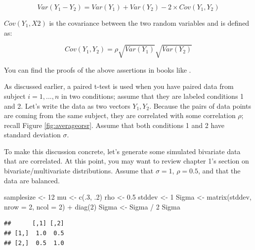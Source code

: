 \documentclass[
  12pt,
]{krantz}
\newenvironment{Shaded}{\begin{snugshade}}{\end{snugshade}}
\newcommand{\AttributeTok}[1]{\textcolor[rgb]{0.77,0.63,0.00}{#1}}
\newcommand{\DecValTok}[1]{\textcolor[rgb]{0.00,0.00,0.81}{#1}}
\newcommand{\FloatTok}[1]{\textcolor[rgb]{0.00,0.00,0.81}{#1}}
\newcommand{\FunctionTok}[1]{\textcolor[rgb]{0.00,0.00,0.00}{#1}}
\newcommand{\NormalTok}[1]{#1}
\newcommand{\OtherTok}[1]{\textcolor[rgb]{0.56,0.35,0.01}{#1}}
\newcommand{\SpecialCharTok}[1]{\textcolor[rgb]{0.00,0.00,0.00}{#1}}
\theoremstyle{definition}
\theoremstyle{definition}
\theoremstyle{definition}
\theoremstyle{definition}
\theoremstyle{remark}
\begin{document}
\begin{equation}
Var(Y_1-Y_2)=Var(Y_1) + Var(Y_2) - 2\times Cov(Y_1, Y_2)
\end{equation}

\(Cov(Y_1, X2)\) is the covariance between the two random variables and is defined as:

\begin{equation}
Cov(Y_1, Y_2) = \rho \sqrt{Var(Y_1)}\sqrt{Var(Y_2)}
\end{equation}

You can find the proofs of the above assertions in books like \citet{rice1995mathematical}.

As discussed earlier, a paired t-test is used when you have paired data from subject \(i=1,...,n\) in two conditions; assume that they are labeled conditions 1 and 2. Let's write the data as two vectors \(Y_{1}, Y_{2}\). Because the pairs of data points are coming from the same subject, they are correlated with some correlation \(\rho\); recall Figure \ref{fig:averageorsr}. Assume that both conditions 1 and 2 have standard deviation \(\sigma\).

To make this discussion concrete, let's generate some simulated bivariate data that are correlated. At this point, you may want to review chapter 1's section on bivariate/multivariate distributions. Assume that \(\sigma = 1\), \(\rho=0.5\), and that the data are balanced.

\begin{Shaded}
\begin{Highlighting}[]
\NormalTok{samplesize }\OtherTok{\textless{}{-}} \DecValTok{12}
\NormalTok{mu }\OtherTok{\textless{}{-}} \FunctionTok{c}\NormalTok{(.}\DecValTok{3}\NormalTok{, .}\DecValTok{2}\NormalTok{)}
\NormalTok{rho }\OtherTok{\textless{}{-}} \FloatTok{0.5}
\NormalTok{stddev }\OtherTok{\textless{}{-}} \DecValTok{1}
\NormalTok{Sigma }\OtherTok{\textless{}{-}} \FunctionTok{matrix}\NormalTok{(stddev, }\AttributeTok{nrow =} \DecValTok{2}\NormalTok{, }\AttributeTok{ncol =} \DecValTok{2}\NormalTok{) }\SpecialCharTok{+} \FunctionTok{diag}\NormalTok{(}\DecValTok{2}\NormalTok{)}
\NormalTok{Sigma }\OtherTok{\textless{}{-}}\NormalTok{ Sigma }\SpecialCharTok{/} \DecValTok{2}
\NormalTok{Sigma}
\end{Highlighting}
\end{Shaded}

\begin{verbatim}
##      [,1] [,2]
## [1,]  1.0  0.5
## [2,]  0.5  1.0
\end{verbatim}
\end{document}
